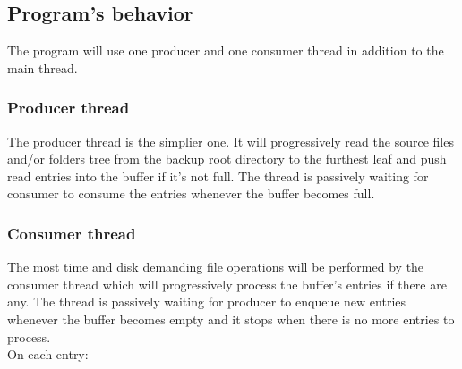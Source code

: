 \documentclass[a4paper]{article}
\begin{document}
    \subsection{Program's behavior}
      The program will use one producer and one consumer thread in addition to the main thread.
      \subsubsection{Producer thread}
        The producer thread is the simplier one. It will progressively read the source files and/or folders tree from the backup root directory to the furthest leaf and push read entries into the buffer if it's not full. The thread is passively waiting for consumer to consume the entries whenever the buffer becomes full.
      \subsubsection{Consumer thread}
        The most time and disk demanding file operations will be performed by the consumer thread which will progressively process the buffer's entries if there are any. The thread is passively waiting for producer to enqueue new entries whenever the buffer becomes empty and it stops when there is no more entries to process. \\
        \indent On each entry:
\end{document}
